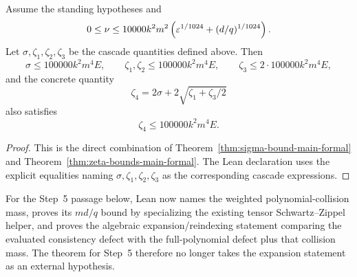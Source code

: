 \begin{theorem}\label{thm:error-cascade-main-formal}
	\leanok
	Assume the standing hypotheses and
	\[
		0 \le \nu \le 10000k^2m^2\left(\varepsilon^{1/1024} + (d/q)^{1/1024}\right).
	\]
	Let $\sigma,\zeta_1,\zeta_2,\zeta_3$ be the cascade quantities defined above. Then
	\[
		\sigma \le 100000k^2m^4 E,
		\qquad
		\zeta_1,\zeta_2 \le 100000k^2m^4 E,
		\qquad
		\zeta_3 \le 2 \cdot 100000k^2m^4 E,
	\]
	and the concrete quantity
	\[
		\zeta_4 = 2\sigma + 2\sqrt{\zeta_1 + \zeta_3/2}
	\]
	also satisfies
	\[
		\zeta_4 \le 100000k^2m^4 E.
	\]
\end{theorem}
\begin{proof}
	\leanok
	This is the direct combination of Theorem~\ref{thm:sigma-bound-main-formal} and Theorem~\ref{thm:zeta-bounds-main-formal}. The Lean declaration uses the explicit equalities naming $\sigma,\zeta_1,\zeta_2,\zeta_3$ as the corresponding cascade expressions.
\end{proof}

\begin{remark}\label{rem:main-formal-step5-sz-bound}
	For the Step~5 passage below, Lean now names the weighted polynomial-collision
	mass, proves its $md/q$ bound by specializing the existing tensor
	Schwartz--Zippel helper, and proves the algebraic expansion/reindexing
	statement comparing the evaluated consistency defect with the full-polynomial
	defect plus that collision mass. The theorem for Step~5 therefore no longer
	takes the expansion statement as an external hypothesis.
\end{remark}

